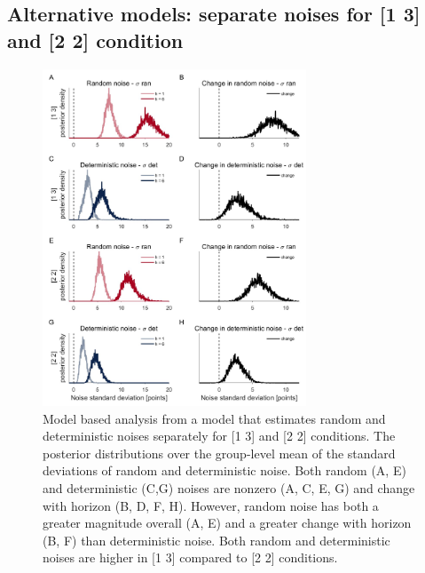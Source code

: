 \documentclass[12pt]{article}
\begin{document}
	\subsection{Alternative models: separate noises for [1 3] and [2 2] condition}
	\begin{figure}[H]
		\begin{center}
			\includegraphics[width=0.7\textwidth]{figures/R1_hyperprior.jpg}
			\caption{Model based analysis from a model that estimates random and deterministic noises separately for [1 3] and [2 2] conditions. The posterior distributions over the group-level mean of the standard deviations of  random and deterministic noise. Both random (A, E) and deterministic (C,G) noises are nonzero (A, C, E, G) and change with horizon (B, D, F, H).  However, random noise has both a greater magnitude overall (A, E) and a greater change with horizon (B, F) than deterministic noise. Both random and deterministic noises are higher in [1 3] compared to [2 2] conditions.}
			\label{fig:s8}
		\end{center}
	\end{figure}
	\newpage
\end{document}
